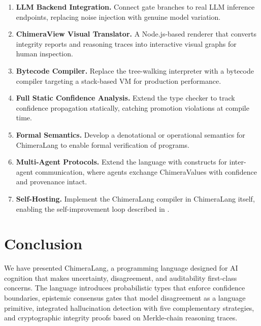 \documentclass[11pt,a4paper]{article}
\begin{document}
\begin{enumerate}[leftmargin=2em]
  \item \textbf{LLM Backend Integration.}
    Connect gate branches to real LLM inference endpoints, replacing
    noise injection with genuine model variation.

  \item \textbf{ChimeraView Visual Translator.}
    A Node.js-based renderer that converts integrity reports and reasoning
    traces into interactive visual graphs for human inspection.

  \item \textbf{Bytecode Compiler.}
    Replace the tree-walking interpreter with a bytecode compiler targeting
    a stack-based VM for production performance.

  \item \textbf{Full Static Confidence Analysis.}
    Extend the type checker to track confidence propagation statically,
    catching promotion violations at compile time.

  \item \textbf{Formal Semantics.}
    Develop a denotational or operational semantics for ChimeraLang to enable
    formal verification of programs.

  \item \textbf{Multi-Agent Protocols.}
    Extend the language with constructs for inter-agent communication,
    where agents exchange ChimeraValues with confidence and provenance intact.

  \item \textbf{Self-Hosting.}
    Implement the ChimeraLang compiler in ChimeraLang itself, enabling
    the self-improvement loop described in .
\end{enumerate}

\section{Conclusion}
\label{sec:conclusion}

We have presented ChimeraLang, a programming language designed for AI cognition
that makes uncertainty, disagreement, and auditability first-class concerns.
The language introduces probabilistic types that enforce confidence boundaries,
epistemic consensus gates that model disagreement as a language primitive,
integrated hallucination detection with five complementary strategies, and
cryptographic integrity proofs based on Merkle-chain reasoning traces.
\end{document}

